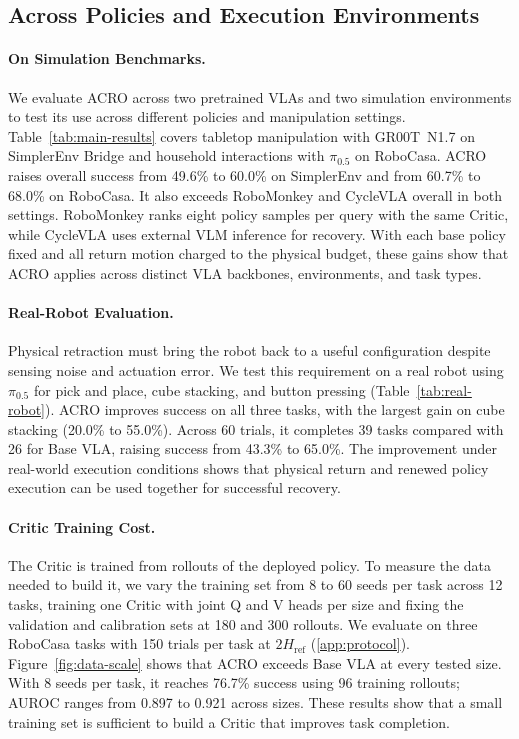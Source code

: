 \subsection{Across Policies and Execution Environments}
\label{sec:main_results}


\paragraph{On Simulation Benchmarks.}
We evaluate ACRO across two pretrained VLAs and two simulation environments to test its use across different policies and manipulation settings. Table~\ref{tab:main-results} covers tabletop manipulation with GR00T~N1.7 on SimplerEnv Bridge and household interactions with $\pi_{0.5}$ on RoboCasa. ACRO raises overall success from 49.6\% to 60.0\% on SimplerEnv and from 60.7\% to 68.0\% on RoboCasa. It also exceeds RoboMonkey and CycleVLA overall in both settings. RoboMonkey ranks eight policy samples per query with the same Critic, while CycleVLA uses external VLM inference for recovery. With each base policy fixed and all return motion charged to the physical budget, these gains show that ACRO applies across distinct VLA backbones, environments, and task types.


\paragraph{Real-Robot Evaluation.}
Physical retraction must bring the robot back to a useful configuration despite sensing noise and actuation error. We test this requirement on a real robot using $\pi_{0.5}$ for pick and place, cube stacking, and button pressing (Table~\ref{tab:real-robot}). ACRO improves success on all three tasks, with the largest gain on cube stacking (20.0\% to 55.0\%). Across 60 trials, it completes 39 tasks compared with 26 for Base VLA, raising success from 43.3\% to 65.0\%. The improvement under real-world execution conditions shows that physical return and renewed policy execution can be used together for successful recovery.
\finishwrap


\paragraph{Critic Training Cost.}
\label{sec:critic-data}
The Critic is trained from rollouts of the deployed policy. To measure the data needed to build it, we vary the training set from 8 to 60 seeds per task across 12 tasks, training one Critic with joint Q and V heads per size and fixing the validation and calibration sets at 180 and 300 rollouts. We evaluate on three RoboCasa tasks with 150 trials per task at $2H_{\mathrm{ref}}$ (\cref{app:protocol}). Figure~\ref{fig:data-scale} shows that ACRO exceeds Base VLA at every tested size. With 8 seeds per task, it reaches 76.7\% success using 96 training rollouts; AUROC ranges from 0.897 to 0.921 across sizes. These results show that a small training set is sufficient to build a Critic that improves task completion.
\finishwrap[3]

